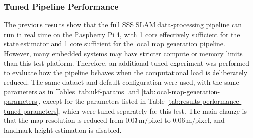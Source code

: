 \subsubsection{Tuned Pipeline Performance}
The previous results show that the full SSS SLAM data-processing pipeline can run in real time on the Raspberry Pi 4, with 1 core effectively sufficient for the state estimator and 1 core sufficient for the local map generation pipeline. However, many embedded systems may have stricter compute or memory limits than this test platform. Therefore, an additional tuned experiment was performed to evaluate how the pipeline behaves when the computational load is deliberately reduced. The same dataset and default configuration were used, with the same parameters as in Tables \ref{tab:ukf-params} and \ref{tab:local-map-generation-parameters}, except for the parameters listed in Table \ref{tab:results-performance-tuned-parameters}, which were tuned separately for this test. The main change is that the map resolution is reduced from $0.03\,\mathrm{m/pixel}$ to $0.06\,\mathrm{m/pixel}$, and landmark height estimation is disabled.
